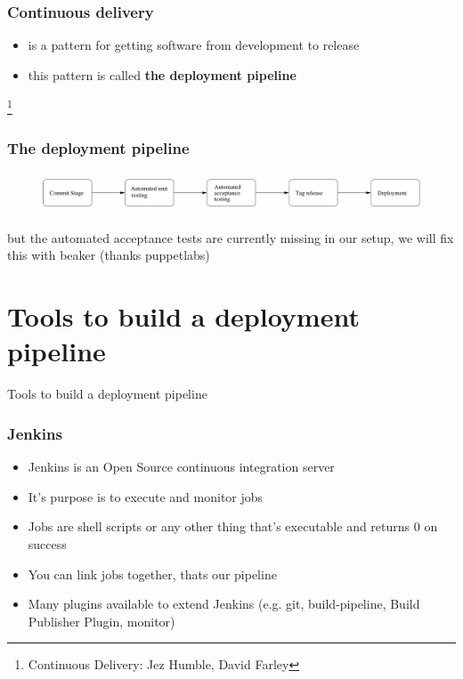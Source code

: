 \documentclass{beamer}
\begin{document}
\begin{frame}
  \frametitle{Continuous delivery}
  \begin{itemize}
  \item<1-> is a pattern for getting software from development to release
  \item<2-> this pattern is called \textbf{the deployment pipeline}
  \end{itemize}
  \footnote{Continuous Delivery: Jez Humble, David Farley}
\end{frame}

\begin{frame}
  \frametitle{The deployment pipeline}
  \begin{figure}[ht]
    \centering
      \includegraphics[height=1.2cm,width=11.5cm]{../pics/deployment_pipline}
    \label{fig:stack}
  \end{figure}
  \pause \tiny but the automated acceptance tests are currently missing in our
  setup, we will fix this with beaker (thanks puppetlabs)
\end{frame}

\section{Tools to build a deployment pipeline}
\begin{frame}
  \center \huge Tools to build a deployment pipeline
\end{frame}


\begin{frame}
  \frametitle{Jenkins}

  \begin{itemize}
  \item Jenkins is an Open Source continuous integration server
  \item It's purpose is to execute and monitor jobs
  \item Jobs are shell scripts or any other thing that's executable
    and returns 0 on success
  \item You can link jobs together, thats our pipeline
  \item Many plugins available to extend Jenkins (e.g. git, build-pipeline, Build Publisher Plugin, monitor)
  \end{itemize}

\end{frame}
\end{document}
